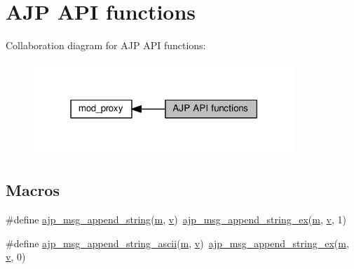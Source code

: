 \hypertarget{group__AJP__api}{}\section{A\+JP A\+PI functions}
\label{group__AJP__api}
Collaboration diagram for A\+JP A\+PI functions\+:
\nopagebreak
\begin{figure}[H]
\begin{center}
\leavevmode
\includegraphics[width=279pt]{group__AJP__api}
\end{center}
\end{figure}
\subsection*{Macros}
\begin{DoxyCompactItemize}
\item 
\#define \hyperlink{group__AJP__api_gafa8848c10c440245d52b6ae2f3a36c17}{ajp\+\_\+msg\+\_\+append\+\_\+string}(\hyperlink{pcretest_8txt_a26e37b17bbd51407fc4163ca327065e4}{m},  \hyperlink{pcregrep_8txt_aeed5af99df1c3051bb73049f9d549819}{v})~\hyperlink{group__AJP__api_gaf3e5e3f96fb4f9c02b5281af41168320}{ajp\+\_\+msg\+\_\+append\+\_\+string\+\_\+ex}(\hyperlink{pcretest_8txt_a26e37b17bbd51407fc4163ca327065e4}{m}, \hyperlink{pcregrep_8txt_aeed5af99df1c3051bb73049f9d549819}{v}, 1)
\item 
\#define \hyperlink{group__AJP__api_ga15fee9960f8e680ead1659608c9dcbfa}{ajp\+\_\+msg\+\_\+append\+\_\+string\+\_\+ascii}(\hyperlink{pcretest_8txt_a26e37b17bbd51407fc4163ca327065e4}{m},  \hyperlink{pcregrep_8txt_aeed5af99df1c3051bb73049f9d549819}{v})~\hyperlink{group__AJP__api_gaf3e5e3f96fb4f9c02b5281af41168320}{ajp\+\_\+msg\+\_\+append\+\_\+string\+\_\+ex}(\hyperlink{pcretest_8txt_a26e37b17bbd51407fc4163ca327065e4}{m}, \hyperlink{pcregrep_8txt_aeed5af99df1c3051bb73049f9d549819}{v}, 0)
\end{DoxyCompactItemize}
